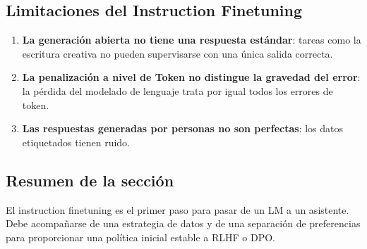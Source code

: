 \subsection{Limitaciones del Instruction Finetuning}

\begin{enumerate}
    \item \textbf{La generación abierta no tiene una respuesta estándar}: tareas como la escritura creativa no pueden supervisarse con una única salida correcta.
    \item \textbf{La penalización a nivel de Token no distingue la gravedad del error}: la pérdida del modelado de lenguaje trata por igual todos los errores de token.
    \item \textbf{Las respuestas generadas por personas no son perfectas}: los datos etiquetados tienen ruido.
\end{enumerate}

\subsection{Resumen de la sección}

El instruction finetuning es el primer paso para pasar de un LM a un asistente. Debe acompañarse de una estrategia de datos y de una separación de preferencias para proporcionar una política inicial estable a RLHF o DPO.

